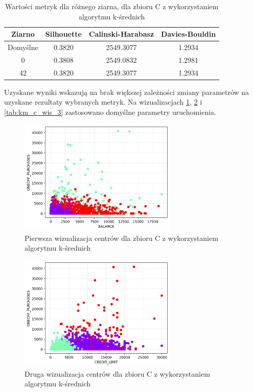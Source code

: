 \documentclass[a4paper,11pt]{article}
\begin{document}
\begin{table}[H]
    \centering
    \begin{tabular}{|c|c|c|c|}
    \hline
    \textbf{Ziarno} & \textbf{Silhouette} & \textbf{Calinski-Harabasz} & \textbf{Davies-Bouldin} \\ \hline
    Domyślne & 0.3820 & 2549.3077 & 1.2934 \\ \hline
    0        & 0.3808 & 2549.0832 & 1.2981 \\ \hline
    42       & 0.3820 & 2549.3077 & 1.2934 \\ \hline
    \end{tabular}
    \caption{Wartości metryk dla różnego ziarna, dla zbioru C z wykorzystaniem algorytmu k-średnich}
    \label{tab:km_c_3}
\end{table}

Uzyskane wyniki wskazują na brak większej zależności zmiany parametrów na uzyskane rezultaty wybranych metryk. Na wizualizacjach \ref{tab:km_c_wis_1}, \ref{tab:km_c_wis_2} i \ref{tab:km_c_wis_3} zastosowano domyślne parametry uruchomienia.

\begin{figure}[H]
    \centering
    \includegraphics[width=0.67\textwidth]{images2/kmeans/Kmeans_CC_1.png}
    \caption{Pierwsza wizualizacja centrów dla zbioru C z wykorzystaniem algorytmu k-średnich}
    \label{tab:km_c_wis_1}
\end{figure}

\begin{figure}[H]
    \centering
    \includegraphics[width=0.67\textwidth]{images2/kmeans/Kmeans_CC_2.png}
    \caption{Druga wizualizacja centrów dla zbioru C z wykorzystaniem algorytmu k-średnich}
    \label{tab:km_c_wis_2}
\end{figure}
\end{document}
